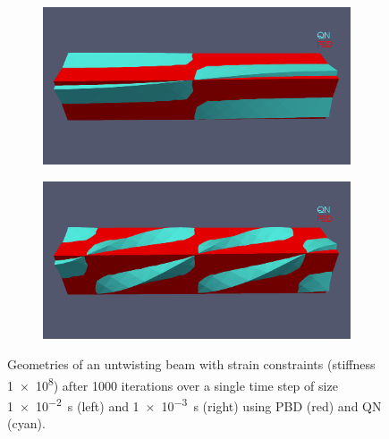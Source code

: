 \begin{figure}[b]
    \begin{subfigure}{0.44\textwidth}
    \includegraphics[width=\textwidth, trim={0 5.0cm 0 2.5cm}, clip]{figures/strain_pbd_1e-2.png}
    \end{subfigure}
    \hfill
    \begin{subfigure}{0.44\textwidth}
    \includegraphics[width=\textwidth, trim={0 5.0cm 0 2.5cm}, clip]{figures/strain_pbd_1e-3.png}
    \end{subfigure}
    \caption{Geometries of an untwisting beam with strain constraints (stiffness \num{1e8}) after 1000 iterations over a single time step of size \SI{1e-2}{\second} (left) 
    and \SI{1e-3}{\second} (right) using PBD (red) and QN (cyan).}
    \label{fig:strain-pbd}
\end{figure}

